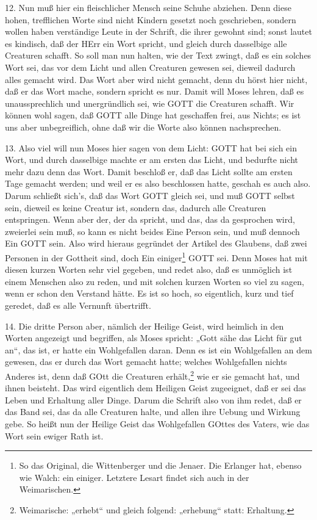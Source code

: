 12. Nun muß hier ein fleischlicher Mensch seine Schuhe abziehen. Denn diese hohen, trefflichen Worte sind nicht Kindern gesetzt noch geschrieben, sondern wollen haben verständige Leute in der Schrift, die ihrer gewohnt sind; sonst lautet es kindisch, daß der HErr ein Wort spricht, und gleich durch dasselbige alle Creaturen schafft. So soll man nun halten, wie der Text zwingt, daß es ein solches Wort sei, das vor dem Licht und allen Creaturen gewesen sei, dieweil dadurch alles gemacht wird. Das Wort aber wird nicht gemacht, denn du hörst hier nicht, daß er das Wort mache, sondern spricht es nur. Damit will Moses lehren, daß es unaussprechlich und unergründlich sei, wie GOTT die Creaturen schafft. Wir können wohl sagen, daß GOTT alle Dinge hat geschaffen frei, aus Nichts; es ist uns aber unbegreiflich, ohne daß wir die Worte also können nachsprechen.

13. Also viel will nun Moses hier sagen von dem Licht: GOTT hat bei sich ein Wort, und durch dasselbige machte er am ersten das Licht, und bedurfte nicht mehr dazu denn das Wort. Damit beschloß er, daß das Licht sollte am ersten Tage gemacht werden; und weil er es also beschlossen hatte, geschah es auch also. Darum schließt sich’s, daß das Wort GOTT gleich sei, und muß GOTT selbst sein, dieweil es keine Creatur ist, sondern das, dadurch alle Creaturen entspringen. Wenn aber der, der da spricht, und das, das da gesprochen wird, zweierlei sein muß, so kann es nicht beides Eine Person sein, und muß dennoch Ein GOTT sein. Also wird hieraus gegründet der Artikel des Glaubens, daß zwei Personen in der Gottheit sind, doch Ein einiger\footnote{So das Original, die Wittenberger und die Jenaer. Die Erlanger hat, ebenso wie Walch: ein einiger. Letztere Lesart findet sich auch in der Weimarischen.} GOTT sei. Denn Moses hat mit
diesen kurzen Worten sehr viel gegeben, und redet also, daß es unmöglich ist einem Menschen also zu reden, und mit solchen kurzen Worten so viel zu sagen, wenn er schon den Verstand hätte. Es ist so hoch, so eigentlich, kurz und tief geredet, daß es alle Vernunft übertrifft.

14. Die dritte Person aber, nämlich der Heilige Geist, wird heimlich in den Worten angezeigt und begriffen, als Moses spricht: „Gott sähe das Licht für gut an“, das ist, er hatte ein Wohlgefallen daran. Denn es ist ein Wohlgefallen an dem gewesen, das er durch das Wort gemacht hatte; welches Wohlgefallen nichts Anderes ist, denn daß GOtt die Creaturen erhält,\footnote{Weimarische: „erhebt“ und gleich folgend: „erhebung“ statt: Erhaltung.} wie er sie gemacht hat, und ihnen beisteht. Das wird eigentlich dem Heiligen Geist zugeeignet, daß er sei das Leben und Erhaltung aller Dinge. Darum die Schrift also von ihm redet, daß er das Band sei, das da alle Creaturen halte, und allen ihre Uebung und Wirkung gebe. So heißt nun der Heilige Geist das Wohlgefallen GOttes des Vaters, wie das Wort sein ewiger Rath ist.

